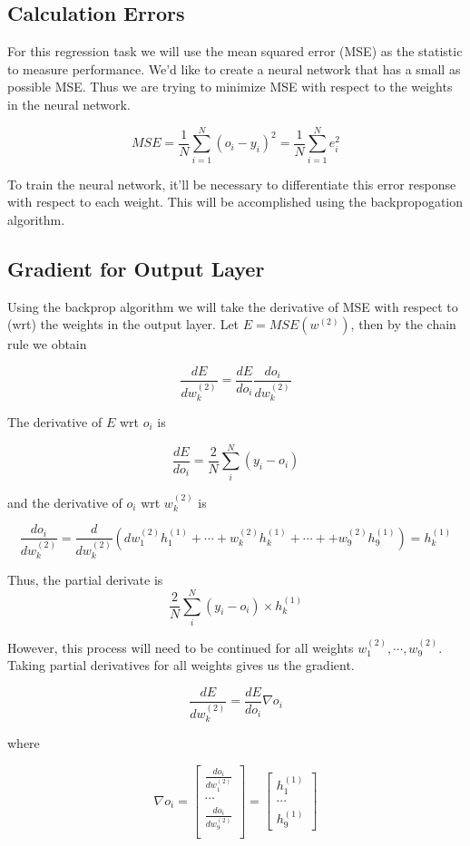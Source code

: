 \documentclass[12pt]{article}%
\begin{document}
\subsection{Calculation Errors}

For this regression task we will use the mean squared error (MSE) as the statistic to measure performance. We'd like to create a neural network that has a small as possible MSE. Thus we are trying to minimize MSE with respect to the weights in the neural network.

$$
MSE = \frac{1}{N} \sum^N_{i = 1} (o_i - y_i)^2 = \frac{1}{N} \sum^N_{i = 1} e_i^2 
$$

To train the neural network, it'll be necessary to differentiate this error response with respect to each weight. This will be accomplished using the backpropogation algorithm.


\subsection{Gradient for Output Layer}

	Using the backprop algorithm we will take the derivative of MSE with respect to (wrt) the weights in the output layer. Let $E = MSE(w^{(2)})$, then by the chain rule we obtain

	$$
	\frac{dE}{dw^{(2)}_k} = \frac{dE}{do_i} \frac{do_i}{dw^{(2)}_k}
	$$

	The derivative of $E$ wrt $o_i$ is 

	$$
	\frac{dE}{do_i} = \frac{2}{N}  \sum^N_{i}  (y_i - o_i)
	$$

	and the derivative of $o_i$ wrt $w^{(2)}_k$ is
	
	$$
	\frac{do_i}{dw^{(2)}_k} = \frac{d}{dw^{(2)}_k}(dw^{(2)}_1 h^{(1)}_1+ \cdots + w^{(2)}_k h^{(1)}_k + \cdots + + w^{(2)}_9 h^{(1)}_9) = h^{(1)}_k
	$$

	Thus, the partial derivate is 
	$$
	\frac{2}{N}  \sum^N_{i}  (y_i - o_i) \times h^{(1)}_k
	$$

However, this process will need to be continued for all weights $w^{(2)}_1, \cdots, w^{(2)}_9$. Taking partial derivatives for all weights gives us the gradient.

	$$
	\frac{dE}{dw^{(2)}_k} = \frac{dE}{do_i} \nabla o_i
	$$

where 

	$$
	\nabla o_i = \begin{bmatrix}
	\frac{do_i}{dw^{(2)}_1} \\ 
	\cdots \\ 
	\frac{do_i}{dw^{(2)}_9} \\ 
	\end{bmatrix}
	= \begin{bmatrix}
	h^{(1)}_1 \\
	\cdots \\
	h^{(1)}_9
	\end{bmatrix}
	$$
\end{document}
